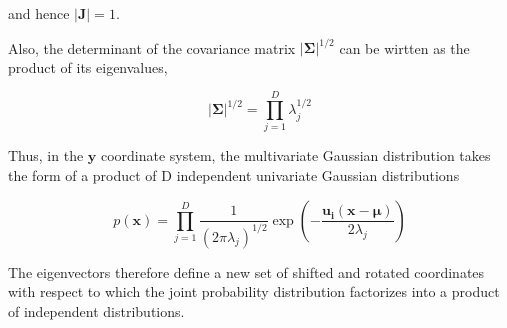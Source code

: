 and hence $|\mathbf{J}| = 1$.

Also, the determinant of the covariance matrix $|\bm{\Sigma}|^{1/2}$ can be wirtten as the product of its eigenvalues,

\begin{equation}
 |\bm{\Sigma}|^{1/2} = \prod_{j=1}^D \lambda_j^{1/2}
\end{equation}

Thus, in the $\mathbf{y}$ coordinate system, the multivariate Gaussian distribution takes the form of a product of D independent univariate Gaussian distributions

\begin{equation}
p(\mathbf{x}) = \prod_{j=1}^D \frac{1}{(2 \pi \lambda_j)^{1/2}} \exp \left( - \frac{\mathbf{u_i}(\mathbf{x}-\bm{\mu}) }{2 \lambda_j } \right)
\end{equation}

The eigenvectors therefore define a new set of shifted and rotated coordinates with respect to which the joint probability distribution factorizes into a product of independent distributions.






